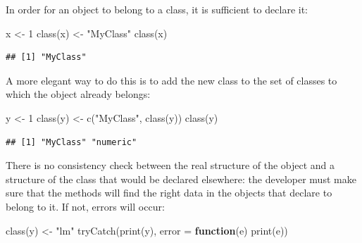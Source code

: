 \documentclass[
  12pt,
  american,
  a4paper,
  extrafontsizes,onecolumn,openright
  ]{memoir}
\newenvironment{Shaded}{\begin{snugshade}}{\end{snugshade}}
\newcommand{\AttributeTok}[1]{\textcolor[rgb]{0.77,0.63,0.00}{#1}}
\newcommand{\ControlFlowTok}[1]{\textcolor[rgb]{0.13,0.29,0.53}{\textbf{#1}}}
\newcommand{\DecValTok}[1]{\textcolor[rgb]{0.00,0.00,0.81}{#1}}
\newcommand{\FunctionTok}[1]{\textcolor[rgb]{0.00,0.00,0.00}{#1}}
\newcommand{\NormalTok}[1]{#1}
\newcommand{\OtherTok}[1]{\textcolor[rgb]{0.56,0.35,0.01}{#1}}
\newcommand{\StringTok}[1]{\textcolor[rgb]{0.31,0.60,0.02}{#1}}
\begin{document}
In order for an object to belong to a class, it is sufficient to declare it:

\scriptsize

\begin{Shaded}
\begin{Highlighting}[]
\NormalTok{x }\OtherTok{\textless{}{-}} \DecValTok{1}
\FunctionTok{class}\NormalTok{(x) }\OtherTok{\textless{}{-}} \StringTok{"MyClass"}
\FunctionTok{class}\NormalTok{(x)}
\end{Highlighting}
\end{Shaded}

\begin{verbatim}
## [1] "MyClass"
\end{verbatim}

\normalsize

A more elegant way to do this is to add the new class to the set of classes to which the object already belongs:

\scriptsize

\begin{Shaded}
\begin{Highlighting}[]
\NormalTok{y }\OtherTok{\textless{}{-}} \DecValTok{1}
\FunctionTok{class}\NormalTok{(y) }\OtherTok{\textless{}{-}} \FunctionTok{c}\NormalTok{(}\StringTok{"MyClass"}\NormalTok{, }\FunctionTok{class}\NormalTok{(y))}
\FunctionTok{class}\NormalTok{(y)}
\end{Highlighting}
\end{Shaded}

\begin{verbatim}
## [1] "MyClass" "numeric"
\end{verbatim}

\normalsize

There is no consistency check between the real structure of the object and a structure of the class that would be declared elsewhere: the developer must make sure that the methods will find the right data in the objects that declare to belong to it.
If not, errors will occur:

\scriptsize

\begin{Shaded}
\begin{Highlighting}[]
\FunctionTok{class}\NormalTok{(y) }\OtherTok{\textless{}{-}} \StringTok{"lm"}
\FunctionTok{tryCatch}\NormalTok{(}\FunctionTok{print}\NormalTok{(y), }\AttributeTok{error =} \ControlFlowTok{function}\NormalTok{(e) }\FunctionTok{print}\NormalTok{(e))}
\end{Highlighting}
\end{Shaded}
\end{document}
